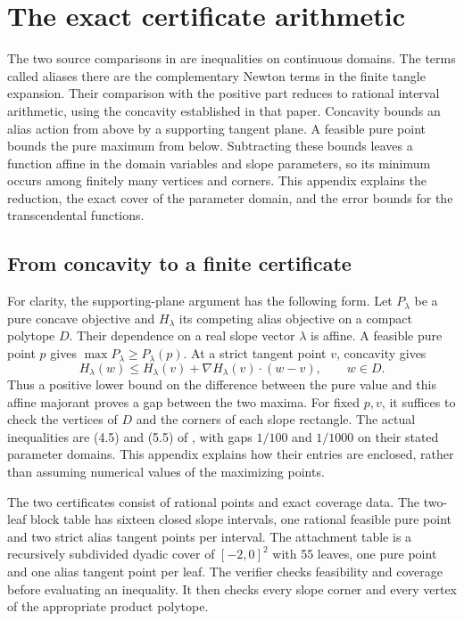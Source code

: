 \chapter{The exact certificate arithmetic}\label{app:certificate}

The two source comparisons in \cite[Lemmas 4.1 and 5.1]{Bounds}
are inequalities on continuous domains. The terms called aliases there
are the complementary Newton terms in the finite tangle expansion.
Their comparison with the positive part reduces to rational interval
arithmetic, using the concavity established in that paper. Concavity bounds an alias action from above by a supporting tangent plane. A feasible pure point bounds the pure maximum from below. Subtracting these bounds leaves a function affine in the domain variables and slope parameters, so its minimum occurs among finitely many vertices and corners. This appendix explains the reduction, the exact cover of the parameter domain, and the error bounds for the transcendental functions.

\section{From concavity to a finite certificate}
For clarity, the supporting-plane argument has the following form.
Let $P_\lambda$ be a pure concave objective and $H_\lambda$ its
competing alias objective on a compact polytope $D$. Their dependence
on a real slope vector $\lambda$ is affine. A feasible pure point $p$
gives $\max P_\lambda\ge P_\lambda(p)$. At a strict tangent point $v$,
concavity gives
\[
 H_\lambda(w)\le H_\lambda(v)
             +\nabla H_\lambda(v)\cdot(w-v),\qquad w\in D.
\]
Thus a positive lower bound on the difference between the pure value
and this affine majorant proves a gap between the two maxima. For fixed
$p,v$, it suffices to check the vertices of $D$ and the corners of each
slope rectangle. The actual inequalities are (4.5) and (5.5) of
\cite{Bounds}, with gaps $1/100$ and $1/1000$ on their stated parameter
domains. This appendix explains how their entries are enclosed, rather
than assuming numerical values of the maximizing points.

The two certificates consist of rational points and exact coverage data. The two-leaf block table has sixteen closed slope intervals, one rational feasible pure point and two strict alias tangent points per interval. The attachment table is a recursively subdivided dyadic cover of $[-2,0]^2$ with 55 leaves, one pure point and one alias tangent point per leaf. The verifier checks feasibility and coverage before evaluating an inequality. It then checks every slope corner and every vertex of the appropriate product polytope.

